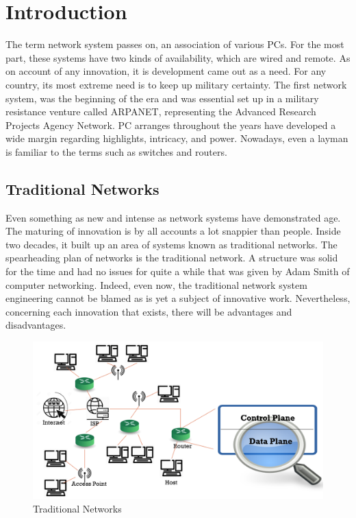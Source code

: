\chapter{Introduction}

The term network system passes on, an association of various PCs. For the most part, these systems have two kinds of availability, which are wired and remote. As on account of any innovation, it is development came out as a need. For any country, its most extreme need is to keep up military certainty. The first network system, was the beginning of the era and was essential set up in a military resistance venture called ARPANET, representing the Advanced Research Projects Agency Network. PC arranges throughout the years have developed a wide margin regarding highlights, intricacy, and power. Nowadays, even a layman is familiar to the terms such as switches and routers.

\vspace{5mm}
\section{Traditional Networks}

Even something as new and intense as network systems have demonstrated age. The maturing of innovation is by all accounts a lot snappier than people. Inside two decades, it built up an area of systems known as traditional networks. The spearheading plan of networks is the traditional network. A structure was solid for the time and had no issues for quite a while that was given by Adam Smith of computer networking. Indeed, even now, the traditional network system engineering cannot be blamed as is yet a subject of innovative work. Nevertheless, concerning each innovation that exists, there will be advantages and disadvantages.

\begin{figure}[!hbt]
    \centering
    \includegraphics[width=\textwidth,keepaspectratio]{images/TRADITIONAL-NETWORK.png}
    \caption{Traditional Networks \cite{sdnimages}}
    \label{fig:Tradnets}
\end{figure}

